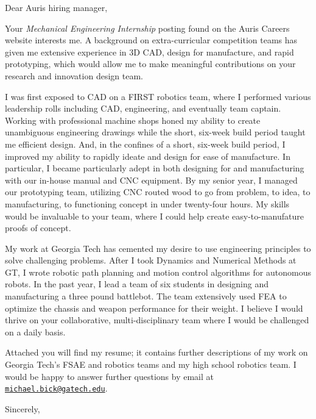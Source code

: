 \documentclass[12pt]{cover_letter}
\date{April 11, 2018}
\begin{document}
  \begin{letter}{}

    \opening{Dear Auris hiring manager,}

    \thispagestyle{fancy}

    Your \textit{Mechanical Engineering Internship} posting found on the Auris Careers website interests me. A background on extra-curricular competition teams has given me extensive experience in 3D CAD, design for manufacture, and rapid prototyping, which would allow me to make meaningful contributions on your research and innovation design team.

    I was first exposed to CAD on a FIRST robotics team, where I performed various leadership rolls including CAD, engineering, and eventually team captain. Working with professional machine shops honed my ability to create unambiguous engineering drawings while the short, six-week build period taught me efficient design. And, in the confines of a short, six-week build period, I improved my ability to rapidly ideate and design for ease of manufacture. In particular, I became particularly adept in both designing for and manufacturing with our in-house manual and CNC equipment. By my senior year, I managed our prototyping team, utilizing CNC routed wood to go from problem, to idea, to manufacturing, to functioning concept in under twenty-four hours. My skills would be invaluable to your team, where I could help create easy-to-manufature proofs of concept.

    My work at Georgia Tech has cemented my desire to use engineering principles to solve challenging problems. After I took Dynamics and Numerical Methods at GT, I wrote robotic path planning and motion control algorithms for autonomous robots. In the past year, I lead a team of six students in designing and manufacturing a three pound battlebot. The team extensively used FEA to optimize the chassis and weapon performance for their weight. I believe I would thrive on your collaborative, multi-disciplinary team where I would be challenged on a daily basis.

    Attached you will find my resume; it contains further descriptions of my work on Georgia Tech's FSAE and robotics teams and my high school robotics team. I would be happy to answer further questions by email at \href{mailto:michael.bick@gatech.edu}{\nolinkurl{michael.bick@gatech.edu}}.

    \closing{Sincerely,}

  \end{letter}
\end{document}
